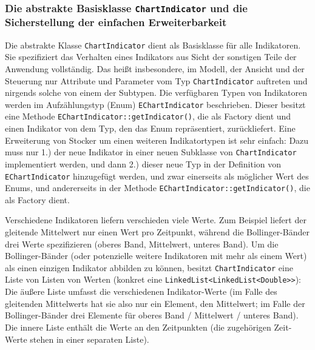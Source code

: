 \documentclass[fontsize=12pt, paper=a4, pagesize=auto, twoside=false, DIV=11, draft=false]{scrartcl}
\begin{document}
\subsubsection{Die abstrakte Basisklasse \texttt{ChartIndicator} und die Sicherstellung der einfachen Erweiterbarkeit}
Die abstrakte Klasse \texttt{ChartIndicator} dient als Basisklasse für alle Indikatoren. Sie spezifiziert das Verhalten eines Indikators aus Sicht der sonstigen Teile der Anwendung vollständig. Das heißt insbesondere, im Modell, der Ansicht und der Steuerung nur Attribute und Parameter vom Typ \texttt{ChartIndicator} auftreten und nirgends solche von einem der Subtypen. Die verfügbaren Typen von Indikatoren werden im Aufzählungstyp (Enum) \texttt{EChart\-In\-di\-ca\-tor} beschrieben. Dieser besitzt eine Methode \texttt{EChart\-In\-di\-ca\-tor::\-get\-In\-di\-ca\-tor()}, die als Factory dient und einen Indikator von dem Typ, den das Enum repräsentiert, zurückliefert. Eine Erweiterung von Stocker um einen weiteren Indikatortypen ist sehr einfach: Dazu muss nur 1.) der neue Indikator in einer neuen Subklasse von \texttt{ChartIndicator} implementiert werden, und dann 2.) dieser neue Typ in der Definition von \texttt{EChart\-In\-di\-ca\-tor} hinzugefügt werden, und zwar einerseits als möglicher Wert des Enums, und andererseits in der Methode \texttt{EChart\-In\-di\-ca\-tor::\-get\-In\-di\-ca\-tor()}, die als Factory dient.

Verschiedene Indikatoren liefern verschieden viele Werte. Zum Beispiel liefert der gleitende Mittelwert nur einen Wert pro Zeitpunkt, während die Bollinger-Bänder drei Werte spezifizieren (oberes Band, Mittelwert, unteres Band). Um die Bollinger-Bänder (oder potenzielle weitere Indikatoren mit mehr als einem Wert) als einen einzigen Indikator abbilden zu können, besitzt \texttt{ChartIndicator} eine Liste von Listen von Werten (konkret eine \texttt{LinkedList<LinkedList<Double>{>}}): Die \glqq äußere{\grqq} Liste umfasst die verschiedenen Indikator-Werte (im Falle des gleitenden Mittelwerts hat sie also nur ein Element, den Mittelwert; im Falle der Bollinger-Bänder drei Elemente für oberes Band / Mittelwert / unteres Band). Die \glqq innere{\grqq} Liste enthält die Werte an den Zeitpunkten (die zugehörigen Zeit-Werte stehen in einer separaten Liste).
\end{document}
